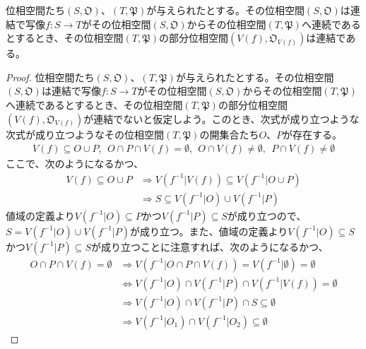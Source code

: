 \documentclass[dvipdfmx]{jsarticle}
\begin{document}
\begin{thm}\label{8.1.5.3}
位相空間たち$\left( S,\mathfrak{O} \right)$、$\left( T,\mathfrak{P} \right)$が与えられたとする。その位相空間$\left( S,\mathfrak{O} \right)$は連結で写像$f:S \rightarrow T$がその位相空間$\left( S,\mathfrak{O} \right)$からその位相空間$\left( T,\mathfrak{P} \right)$へ連続であるとするとき、その位相空間$\left( T,\mathfrak{P} \right)$の部分位相空間$\left( V(f),\mathfrak{O}_{V(f)} \right)$は連結である。
\end{thm}
\begin{proof}
位相空間たち$\left( S,\mathfrak{O} \right)$、$\left( T,\mathfrak{P} \right)$が与えられたとする。その位相空間$\left( S,\mathfrak{O} \right)$は連結で写像$f:S \rightarrow T$がその位相空間$\left( S,\mathfrak{O} \right)$からその位相空間$\left( T,\mathfrak{P} \right)$へ連続であるとするとき、その位相空間$\left( T,\mathfrak{P} \right)$の部分位相空間$\left( V(f),\mathfrak{O}_{V(f)} \right)$が連結でないと仮定しよう。このとき、次式が成り立つような次式が成り立つようなその位相空間$\left( T,\mathfrak{P} \right)$の開集合たち$O$、$P$が存在する。
\begin{align*}
V(f) \subseteq O \cup P,\ \ O \cap P \cap V(f) = \emptyset,\ \ O \cap V(f) \neq \emptyset,\ \ P \cap V(f) \neq \emptyset
\end{align*}
ここで、次のようになるかつ、
\begin{align*}
V(f) \subseteq O \cup P &\Rightarrow V\left( f^{- 1}|V(f) \right) \subseteq V\left( f^{- 1}|O \cup P \right)\\
&\Rightarrow S \subseteq V\left( f^{- 1}|O \right) \cup V\left( f^{- 1}|P \right)
\end{align*}
値域の定義より$V\left( f^{- 1}|O \right) \subseteq P$かつ$V\left( f^{- 1}|P \right) \subseteq S$が成り立つので、$S = V\left( f^{- 1}|O \right) \cup V\left( f^{- 1}|P \right)$が成り立つ。また、値域の定義より$V\left( f^{- 1}|O \right) \subseteq S$かつ$V\left( f^{- 1}|P \right) \subseteq S$が成り立つことに注意すれば、次のようになるかつ、
\begin{align*}
O \cap P \cap V(f) = \emptyset &\Rightarrow V\left( f^{- 1}|O \cap P \cap V(f) \right) = V\left( f^{- 1}|\emptyset \right) = \emptyset\\
&\Leftrightarrow V\left( f^{- 1}|O \right) \cap V\left( f^{- 1}|P \right) \cap V\left( f^{- 1}|V(f) \right) = \emptyset\\
&\Rightarrow V\left( f^{- 1}|O \right) \cap V\left( f^{- 1}|P \right) \cap S \subseteq \emptyset\\
&\Rightarrow V\left( f^{- 1}|O_{1} \right) \cap V\left( f^{- 1}|O_{2} \right) \subseteq \emptyset

\end{align*}
\end{proof}
\end{document}
